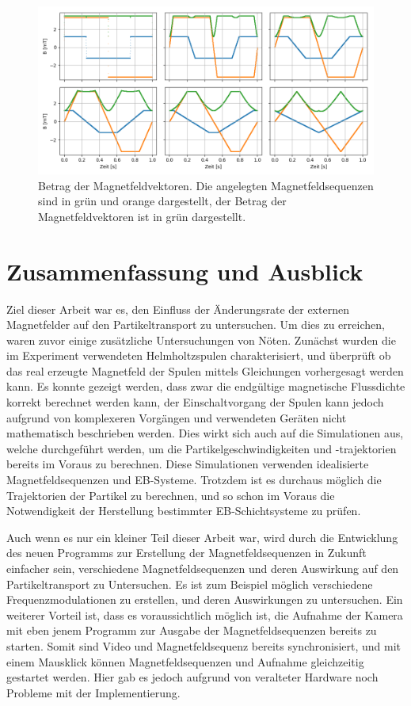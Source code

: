 \documentclass[page,pdftex,12pt,a4paper,twoside,openright]{scrbook}
\begin{document}
\begin{figure}[h]
\centering
\includegraphics[width=\textwidth]{./img/magnitude.png}
\caption{\label{fig-betrag}
Betrag der Magnetfeldvektoren. Die angelegten Magnetfeldsequenzen sind in grün und orange dargestellt, der Betrag der Magnetfeldvektoren ist in grün dargestellt.}
\end{figure}

\chapter{Zusammenfassung und Ausblick \label{sec-zusammenfassung}}
\label{sec:org9d2b45b}
Ziel dieser Arbeit war es, den Einfluss der Änderungsrate der externen Magnetfelder auf den Partikeltransport zu untersuchen. Um dies zu erreichen, waren zuvor einige zusätzliche Untersuchungen von Nöten. Zunächst wurden die im Experiment verwendeten Helmholtzspulen charakterisiert, und überprüft ob das real erzeugte Magnetfeld der Spulen mittels Gleichungen vorhergesagt werden kann. Es konnte gezeigt werden, dass zwar die endgültige magnetische Flussdichte korrekt berechnet werden kann, der Einschaltvorgang der Spulen kann jedoch aufgrund von komplexeren Vorgängen und verwendeten Geräten nicht mathematisch beschrieben werden. Dies wirkt sich auch auf die Simulationen aus, welche durchgeführt werden, um die Partikelgeschwindigkeiten und -trajektorien bereits im Voraus zu berechnen. Diese Simulationen verwenden idealisierte Magnetfeldsequenzen und EB-Systeme. Trotzdem ist es durchaus möglich die Trajektorien der Partikel zu berechnen, und so schon im Voraus die Notwendigkeit der Herstellung bestimmter EB-Schichtsysteme zu prüfen.

Auch wenn es nur ein kleiner Teil dieser Arbeit war, wird durch die Entwicklung des neuen Programms zur Erstellung der Magnetfeldsequenzen in Zukunft einfacher sein, verschiedene Magnetfeldsequenzen und deren Auswirkung auf den Partikeltransport zu Untersuchen. Es ist zum Beispiel möglich verschiedene Frequenzmodulationen zu erstellen, und deren Auswirkungen zu untersuchen.
Ein weiterer Vorteil ist, dass es voraussichtlich möglich ist, die Aufnahme der Kamera mit eben jenem Programm zur Ausgabe der Magnetfeldsequenzen bereits zu starten. Somit sind Video und Magnetfeldsequenz bereits synchronisiert, und mit einem Mausklick können Magnetfeldsequenzen und Aufnahme gleichzeitig gestartet werden. Hier gab es jedoch aufgrund von veralteter Hardware noch Probleme mit der Implementierung.
\end{document}

